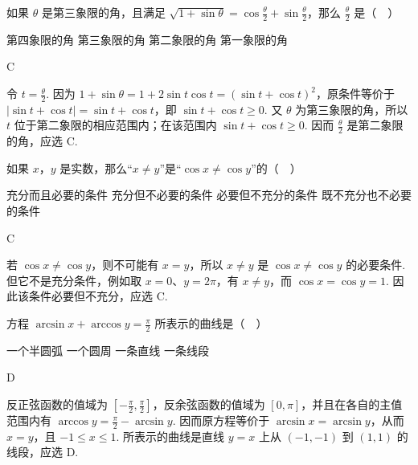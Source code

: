 \begin{problem}
如果 \(\theta\) 是第三象限的角，且满足 \(\sqrt{1+\sin \theta}=\cos \frac{\theta}{2}+\sin \frac{\theta}{2}\)，那么 \(\frac{\theta}{2}\) 是（\(\quad\)）

\choices
    {第四象限的角}
    {第三象限的角}
    {第二象限的角}
    {第一象限的角}
\end{problem}

\begin{answer}
C
\end{answer}

\begin{solution}
令 \(t=\frac\theta2\). 因为 \(1+\sin\theta=1+2\sin t\cos t=(\sin t+\cos t)^2\)，原条件等价于
\(\lvert\sin t+\cos t\rvert=\sin t+\cos t\)，即 \(\sin t+\cos t\geqslant0\). 又 \(\theta\) 为第三象限的角，所以 \(t\) 位于第二象限的相应范围内；在该范围内 \(\sin t+\cos t\geqslant0\). 因而 \(\frac\theta2\) 是第二象限的角，应选 C.
\end{solution}

\begin{problem}
如果 \(x\)，\(y\) 是实数，那么“\(x\neq y\)”是“\(\cos x\neq \cos y\)”的（\(\quad\)）

\choices
    {充分而且必要的条件}
    {充分但不必要的条件}
    {必要但不充分的条件}
    {既不充分也不必要的条件}
\end{problem}

\begin{answer}
C
\end{answer}

\begin{solution}
若 \(\cos x\neq\cos y\)，则不可能有 \(x=y\)，所以 \(x\neq y\) 是 \(\cos x\neq\cos y\) 的必要条件. 但它不是充分条件，例如取 \(x=0\)、\(y=2\pi\)，有 \(x\neq y\)，而 \(\cos x=\cos y=1\). 因此该条件必要但不充分，应选 C.
\end{solution}

\begin{problem}
方程 \(\arcsin x+\arccos y=\frac{\pi}{2}\) 所表示的曲线是（\(\quad\)）

\choices
    {一个半圆弧}
    {一个圆周}
    {一条直线}
    {一条线段}
\end{problem}

\begin{answer}
D
\end{answer}

\begin{solution}
反正弦函数的值域为 \(\left[-\frac\pi2,\frac\pi2\right]\)，反余弦函数的值域为 \([0,\pi]\)，并且在各自的主值范围内有 \(\arccos y=\frac\pi2-\arcsin y\). 因而原方程等价于
\(\arcsin x=\arcsin y\)，从而 \(x=y\)，且 \(-1\leqslant x\leqslant1\). 所表示的曲线是直线 \(y=x\) 上从 \((-1,-1)\) 到 \((1,1)\) 的线段，应选 D.
\end{solution}

